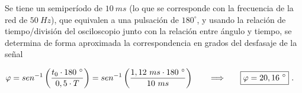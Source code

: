         Se tiene un semiperíodo de $10~ms$ (lo que se corresponde con la frecuencia de la red de $50~Hz$),
        que equivalen a una pulsación de $180 ^{\circ}$, y usando la relación de tiempo/división del 
        osciloscopio junto con la relación entre ángulo y tiempo, se determina de forma aproximada la correspondencia 
        en grados del desfasaje de la señal

        \begin{align*}
          \varphi = sen ^{-1} \left( \dfrac{t_{0} \cdot 180\ ^{\circ}}{0,5 \cdot T} \right) = sen ^{-1} \left( \dfrac{1,12~ms \cdot 180\ ^{\circ}}{10~ms} \right) \hspace{20pt} \Longrightarrow \hspace{20pt} \Aboxed{\varphi = 20,16\ ^{\circ}}\ .
        \end{align*}    

   
